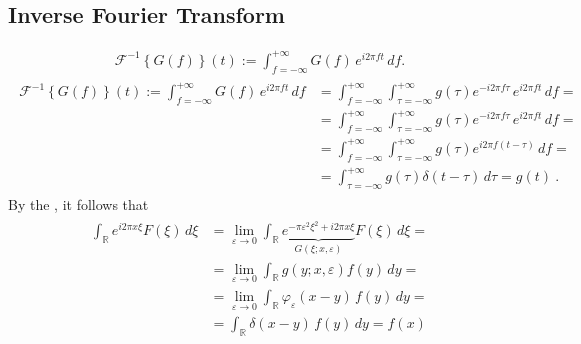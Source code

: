 \documentclass[letterpaper,10pt,english]{jupyterBook}
\begin{document}
\subsection{Inverse Fourier Transform}
\label{\detokenize{ch/complex/fourier:inverse-fourier-transform}}\begin{equation*}
\begin{split}\mathscr{F}^{-1}\left\{ G(f) \right\}(t) := \int_{f = -\infty}^{+\infty} G(f) \, e^{i 2 \pi f t} \, df .\end{split}
\end{equation*}
\sphinxAtStartPar
{}
\begin{equation*}
\begin{split}\begin{aligned}
\mathscr{F}^{-1}\left\{ G(f) \right\}(t) := \int_{f = -\infty}^{+\infty} G(f) \, e^{i 2 \pi f t} \, df 
  & = \int_{f = -\infty}^{+\infty} \int_{\tau=-\infty}^{+\infty} g(\tau) e^{-i 2 \pi f \tau} \, e^{i 2 \pi f t} \, df = \\ 
  & = \int_{f = -\infty}^{+\infty} \int_{\tau=-\infty}^{+\infty} g(\tau) e^{-i 2 \pi f \tau} \, e^{i 2 \pi f t} \, df = \\ 
  & = \int_{f = -\infty}^{+\infty} \int_{\tau=-\infty}^{+\infty} g(\tau) e^{i 2 \pi f (t-\tau)} \, df = \\ 
  & = \int_{\tau=-\infty}^{+\infty} g(\tau) \delta(t-\tau) \, d\tau = g(t) \ . 
\end{aligned}\end{split}
\end{equation*}
\sphinxAtStartPar
{} By the , it follows that
\begin{equation*}
\begin{split}\begin{aligned}
  \int_{\mathbb{R}} e^{i 2 \pi x \xi} F(\xi) \, d \xi
  & = \lim_{\varepsilon \rightarrow 0} \int_{\mathbb{R}} \underbrace{e^{-\pi \varepsilon^2 \xi^2 + i 2 \pi x \xi}}_{G(\xi;x,\varepsilon)} F(\xi) \, d \xi = \\
  & = \lim_{\varepsilon \rightarrow 0} \int_{\mathbb{R}} g(y;x,\varepsilon) f(y) \, dy = \\
  & = \lim_{\varepsilon \rightarrow 0} \int_{\mathbb{R}} \varphi_{\varepsilon}(x-y) \, f(y) \, dy = \\
  & = \int_{\mathbb{R}} \delta(x-y) \, f(y) \, dy = f(x)
\end{aligned}\end{split}
\end{equation*}
\end{document}
